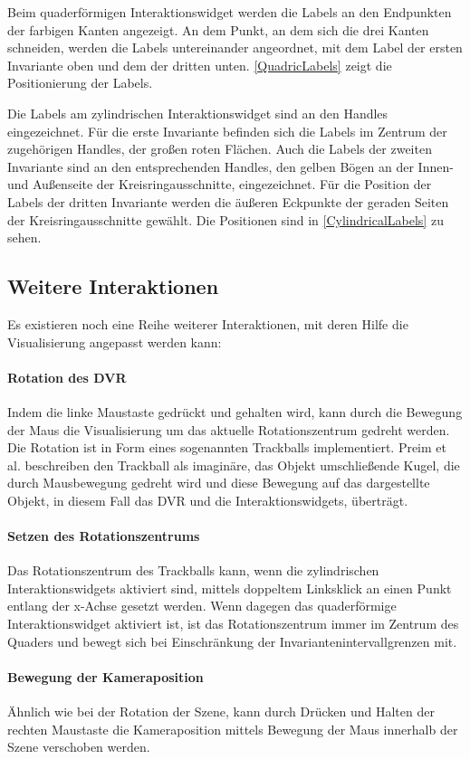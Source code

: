 \documentclass[a4paper,fontsize=12pt,toc=bib,parskip=half,ngerman]{scrartcl}
\begin{document}
Beim quaderf\"ormigen Interaktionswidget werden die Labels an den Endpunkten der farbigen Kanten angezeigt. An dem Punkt, an dem sich die drei Kanten schneiden, werden die Labels untereinander angeordnet, mit dem Label der ersten Invariante oben und dem der dritten unten. \cref{QuadricLabels} zeigt die Positionierung der Labels.

Die Labels am zylindrischen Interaktionswidget sind an den Handles eingezeichnet. F\"ur die erste Invariante befinden sich die Labels im Zentrum der zugeh\"origen Handles, der gro{\ss}en roten Fl\"achen. 
Auch die Labels der zweiten Invariante sind an den entsprechenden Handles, den gelben B\"ogen an der Innen- und Au{\ss}enseite der Kreisringausschnitte, eingezeichnet.
F\"ur die Position der Labels der dritten Invariante werden die \"au{\ss}eren Eckpunkte der geraden Seiten der Kreisringausschnitte gew\"ahlt. Die Positionen sind in \cref{CylindricalLabels} zu sehen.

\subsection{Weitere Interaktionen}
Es existieren noch eine Reihe weiterer Interaktionen, mit deren Hilfe die Visualisierung angepasst werden kann:
\paragraph{Rotation des DVR}
Indem die linke Maustaste gedr\"uckt und gehalten wird, kann durch die Bewegung der Maus die Visualisierung um das aktuelle Rotationszentrum gedreht werden. Die Rotation ist in Form eines sogenannten \glq Trackballs\grq{} implementiert. Preim et al. beschreiben den Trackball als imagin\"are, das Objekt umschlie{\ss}ende Kugel, die durch Mausbewegung gedreht wird und diese Bewegung auf das dargestellte Objekt, in diesem Fall das DVR und die Interaktionswidgets, \"ubertr\"agt.
\paragraph{Setzen des Rotationszentrums}
Das Rotationszentrum des Trackballs kann, wenn die zylindrischen Interaktionswidgets aktiviert sind, mittels doppeltem Linksklick an einen Punkt entlang der x-Achse gesetzt werden. Wenn dagegen das quaderf\"ormige Interaktionswidget aktiviert ist, ist das Rotationszentrum immer im Zentrum des Quaders und bewegt sich bei Einschr\"ankung der Invariantenintervallgrenzen mit.
\paragraph{Bewegung der Kameraposition}
\"Ahnlich wie bei der Rotation der Szene, kann durch Dr\"ucken und Halten der rechten Maustaste die Kameraposition mittels Bewegung der Maus innerhalb der Szene verschoben werden. 
\end{document}
